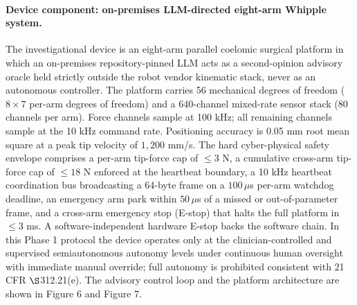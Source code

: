 \paragraph{Device component: on-premises LLM-directed eight-arm Whipple system.}
The investigational device is an eight-arm parallel coelomic surgical platform in
which an on-premises repository-pinned LLM acts as a second-opinion advisory oracle
held strictly outside the robot vendor kinematic stack, never as an autonomous
controller. The platform carries 56 mechanical degrees of freedom ($8\times7$
per-arm degrees of freedom) and a 640-channel mixed-rate sensor stack (80 channels
per arm). Force channels sample at 100 kHz; all remaining channels sample at the
10 kHz command rate. Positioning accuracy is 0.05 mm root mean square at a peak tip
velocity of $1{,}200$ mm/s. The hard cyber-physical safety envelope comprises a
per-arm tip-force cap of $\leq 3$ N, a cumulative cross-arm tip-force cap of
$\leq 18$ N enforced at the heartbeat boundary, a 10 kHz heartbeat coordination bus
broadcasting a 64-byte frame on a $100\,\mu$s per-arm watchdog deadline, an
emergency arm park within $50\,\mu$s of a missed or out-of-parameter frame, and a
cross-arm emergency stop (E-stop) that halts the full platform in $\leq 3$ ms.
A software-independent hardware E-stop backs the software chain. In this Phase 1
protocol the device operates only at the clinician-controlled and supervised
semiautonomous autonomy levels under continuous human oversight with immediate
manual override; full autonomy is prohibited consistent with 21 CFR
$\S$312.21(e). The advisory control loop and the platform architecture are shown
in Figure 6 and Figure 7.

